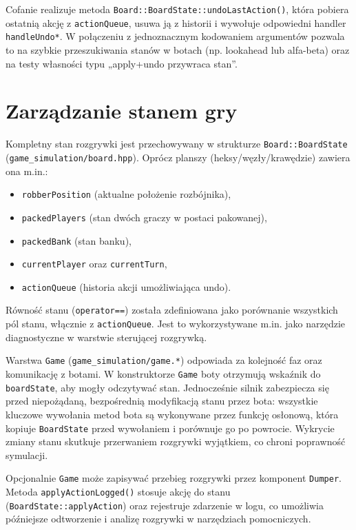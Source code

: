 \documentclass[polish,inz,longabstract]{iithesis}
\begin{document}
Cofanie realizuje metoda \texttt{Board::BoardState::undoLastAction()}, która pobiera ostatnią akcję z \texttt{actionQueue}, usuwa ją z historii i wywołuje odpowiedni handler \texttt{handleUndo*}. W połączeniu z jednoznacznym kodowaniem argumentów pozwala to na szybkie przeszukiwania stanów w botach (np. lookahead lub alfa-beta) oraz na testy własności typu „apply+undo przywraca stan”.


\section{Zarządzanie stanem gry}

Kompletny stan rozgrywki jest przechowywany w strukturze \texttt{Board::BoardState} (\texttt{game\_simulation/board.hpp}). Oprócz planszy (heksy/węzły/krawędzie) zawiera ona m.in.:

\begin{itemize}
\item \texttt{robberPosition} (aktualne położenie rozbójnika),
\item \texttt{packedPlayers\cite{2}} (stan dwóch graczy w postaci pakowanej),
\item \texttt{packedBank} (stan banku),
\item \texttt{currentPlayer} oraz \texttt{currentTurn},
\item \texttt{actionQueue} (historia akcji umożliwiająca undo).
\end{itemize}

Równość stanu (\texttt{operator==}) została zdefiniowana jako porównanie wszystkich pól stanu, włącznie z \texttt{actionQueue}. Jest to wykorzystywane m.in. jako narzędzie diagnostyczne w warstwie sterującej rozgrywką.

Warstwa \texttt{Game} (\texttt{game\_simulation/game.*}) odpowiada za kolejność faz oraz komunikację z botami. W konstruktorze \texttt{Game} boty otrzymują wskaźnik do \texttt{boardState}, aby mogły odczytywać stan. Jednocześnie silnik zabezpiecza się przed niepożądaną, bezpośrednią modyfikacją stanu przez bota: wszystkie kluczowe wywołania metod bota są wykonywane przez funkcję osłonową, która kopiuje \texttt{BoardState} przed wywołaniem i porównuje go po powrocie. Wykrycie zmiany stanu skutkuje przerwaniem rozgrywki wyjątkiem, co chroni poprawność symulacji.

Opcjonalnie \texttt{Game} może zapisywać przebieg rozgrywki przez komponent \texttt{Dumper}. Metoda \texttt{applyActionLogged()} stosuje akcję do stanu (\texttt{BoardState::applyAction}) oraz rejestruje zdarzenie w logu, co umożliwia późniejsze odtworzenie i analizę rozgrywki w narzędziach pomocniczych.
\end{document}
